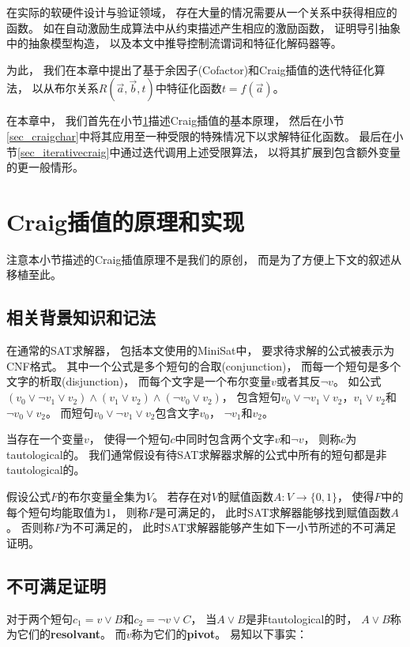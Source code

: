 在实际的软硬件设计与验证领域，
存在大量的情况需要从一个关系中获得相应的函数。
如在自动激励生成算法中从约束描述产生相应的激励函数，
证明导引抽象中的抽象模型构造，
以及本文中推导控制流谓词和特征化解码器等。

为此，
我们在本章中提出了基于余因子(Cofactor)和Craig插值的迭代特征化算法，
以从布尔关系$R(\vec{a},\vec{b},t)$中特征化函数$t=f(\vec{a})$。

在本章中，
我们首先在小节\ref{sec_craigimp}描述Craig插值的基本原理，
然后在小节\ref{sec_craigchar}中将其应用至一种受限的特殊情况下以求解特征化函数。
最后在小节\ref{sec_iterativecraig}中通过迭代调用上述受限算法，
以将其扩展到包含额外变量的更一般情形。

\section{Craig插值的原理和实现}\label{sec_craigimp}
注意本小节描述的Craig插值原理不是我们的原创，
而是为了方便上下文的叙述从 移植至此。
\subsection{相关背景知识和记法}
在通常的SAT求解器，
包括本文使用的MiniSat中，
要求待求解的公式被表示为CNF格式。
其中一个公式是多个短句的合取(conjunction)，
而每一个短句是多个文字的析取(disjunction)，
而每个文字是一个布尔变量$v$或者其反$\neg v$。
如公式$(v_0\vee\neg v_1\vee v_2)\wedge(v_1\vee v_2)\wedge(\neg v_0\vee v_2)$，
包含短句$v_0\vee\neg v_1\vee v_2$，$v_1\vee v_2$和$\neg v_0\vee v_2$。
而短句$v_0\vee\neg v_1\vee v_2$包含文字$v_0$， $\neg v_1$和$v_2$。

当存在一个变量$v$，
使得一个短句$c$中同时包含两个文字$v$和$\neg v$，
则称$c$为tautological的。
我们通常假设有待SAT求解器求解的公式中所有的短句都是非tautological的。

假设公式$F$的布尔变量全集为$V$。
若存在对$V$的赋值函数$A:V\to \{0,1\}$，
使得$F$中的每个短句均能取值为1，
则称$F$是可满足的，
此时SAT求解器能够找到赋值函数$A$。
否则称$F$为不可满足的，
此时SAT求解器能够产生如下一小节所述的不可满足证明。

\subsection{不可满足证明}
对于两个短句$c_1=v\vee B$和$c_2=\neg v\vee C$，
当$A\vee B$是非tautological的时，
$A\vee B$称为它们的\textbf{resolvant}。
而$v$称为它们的\textbf{pivot}。
易知以下事实：

